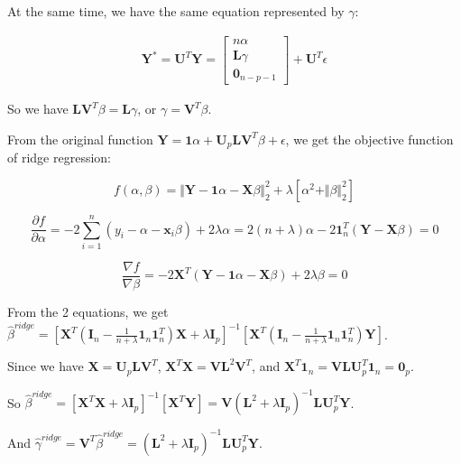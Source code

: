 \documentclass[paper=letter, fontsize=12pt]{article}
\begin{document}
\begin{enumerate}[label=(\alph*)]
	At the same time, we have the same equation represented by $\gamma$:
	
	\begin{eqnarray*}
	\mathbf{Y}^* = \mathbf{U}^{T} \mathbf{Y} = 
		\begin{bmatrix}
			n\alpha \\
			\mathbf{L} \gamma \\
			\mathbf{0}_{n-p-1}
		\end{bmatrix} + \mathbf{U}^T \epsilon
	\end{eqnarray*}

	So we have $\mathbf{L} \mathbf{V}^T \beta = \mathbf{L} \gamma$, or $\gamma = \mathbf{V}^{T} \beta$.
	
	From the original function $\mathbf{Y} = \mathbf{1} \alpha + \mathbf{U}_{p} \mathbf{L} \mathbf{V}^{T} \beta + \epsilon$, we get the objective function of ridge regression:
	
	\begin{equation*}
	f(\alpha, \beta) = \Vert \mathbf{Y} - \mathbf{1} \alpha - \mathbf{X} \beta \Vert_2^2 + \lambda [\alpha^2 + \Vert \beta \Vert_2^2]
	\end{equation*}
	
	\begin{equation*}
	\frac{\partial f}{\partial \alpha} = -2 \sum_{i = 1}^{n} (y_i - \alpha - \mathbf{x}_i \beta) + 2 \lambda \alpha = 2(n + \lambda) \alpha -2 \mathbf{1}^{T}_{n} (\mathbf{Y} - \mathbf{X} \beta)  = 0
	\end{equation*}
	
	\begin{equation*}
	\frac{\nabla f}{\nabla \beta} = -2 \mathbf{X}^{T} (\mathbf{Y} - \mathbf{1} \alpha - \mathbf{X} \beta) + 2 \lambda \beta = 0
	\end{equation*}
	
	From the 2 equations, we get $\hat{\beta}^{ridge} = [\mathbf{X}^{T} (\mathbf{I}_n - \frac{1}{n + \lambda} \mathbf{1}_n \mathbf{1}_n^{T}) \mathbf{X} + \lambda \mathbf{I}_p]^{-1} [\mathbf{X}^{T} (\mathbf{I}_{n} - \frac{1}{n + \lambda} \mathbf{1}_n \mathbf{1}_n^{T}) \mathbf{Y}]$.
	
	Since we have $\mathbf{X} = \mathbf{U}_p \mathbf{L} \mathbf{V}^{T}$, $\mathbf{X}^{T} \mathbf{X} = \mathbf{V} \mathbf{L}^2 \mathbf{V}^{T}$, and $\mathbf{X}^{T} \mathbf{1}_{n} = \mathbf{V} \mathbf{L} \mathbf{U}^{T}_{p} \mathbf{1}_n = \mathbf{0}_{p}$.
	
	So $\hat{\beta}^{ridge} = [\mathbf{X}^{T} \mathbf{X} + \lambda \mathbf{I}_p]^{-1} [\mathbf{X}^{T} \mathbf{Y}] = \mathbf{V} (\mathbf{L}^2 + \lambda \mathbf{I}_{p})^{-1} \mathbf{L} \mathbf{U}^{T}_{p} \mathbf{Y}$. 
	
	And $\hat{\gamma}^{ridge} = \mathbf{V}^{T} \hat{\beta}^{ridge} = (\mathbf{L}^2 + \lambda \mathbf{I}_{p})^{-1} \mathbf{L} \mathbf{U}^{T}_{p} \mathbf{Y}$.
\end{enumerate}
\end{document}
